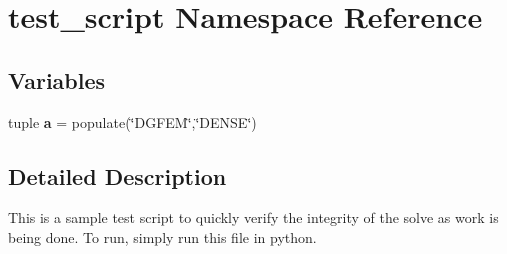 \hypertarget{namespacetest__script}{\section{test\+\_\+script Namespace Reference}
\label{namespacetest__script}
}
\subsection*{Variables}
\begin{DoxyCompactItemize}
\item 
\hypertarget{namespacetest__script_ad171d176831b53cb688495d8feab295d}{tuple {\bfseries a} = populate(\char`\"{}D\+G\+F\+E\+M\char`\"{},\char`\"{}D\+E\+N\+S\+E\char`\"{})}\label{namespacetest__script_ad171d176831b53cb688495d8feab295d}

\end{DoxyCompactItemize}


\subsection{Detailed Description}
\begin{DoxyVerb}This is a sample test script to quickly verify the integrity of the solve as work is being done.  To run, 
simply run this file in python. \end{DoxyVerb}
 